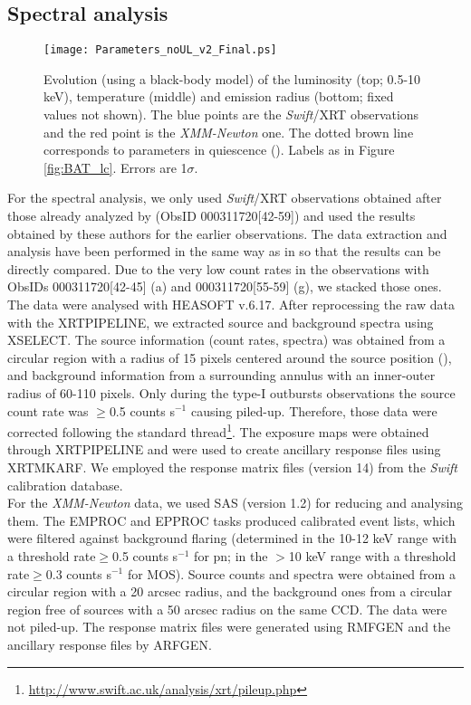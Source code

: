 \documentclass[a4paper,fleqn,usenatbib]{mnras}
\begin{document}
\subsection{Spectral analysis}\label{subsec:spectra}
\begin{figure}
\centering
\texttt{[image: Parameters\_noUL\_v2\_Final.ps]}
    \caption{Evolution (using a black-body model) of the luminosity (top; 0.5-10 keV), temperature (middle) and emission radius (bottom; fixed values not shown). The blue points are the \textit{Swift}/XRT observations and the red point is the \textit{XMM-Newton} one. The dotted brown line corresponds to parameters in quiescence (\citealt{Tsygankov2017b}). Labels as in Figure \ref{fig:BAT_lc}. Errors are 1$\sigma$.}
   \label{fig:Parameters}
\end{figure}
For the spectral analysis, we only used \textit{Swift}/XRT observations obtained after those already analyzed by \cite{Wijnands2016} (ObsID 000311720[42-59]) and used the results obtained by these authors for the earlier observations. The data extraction and analysis have been performed in the same way as in \cite{Wijnands2016} so that the results can be directly compared. Due to the very low count rates in the observations with ObsIDs 000311720[42-45] (a) and 000311720[55-59] (g), we stacked those ones. The data were analysed with HEASOFT v.6.17. After reprocessing the raw data with the XRTPIPELINE, we extracted source and background spectra using XSELECT. The source information (count rates, spectra) was obtained from a circular region with a radius of 15 pixels centered around the source position (\citealt{Reig2015}), and background information from a surrounding annulus with an inner-outer radius of 60-110 pixels. Only during the type-I outbursts observations the source count rate was $\geq$0.5 counts s$^{-1}$ causing piled-up. Therefore, those data were corrected following the standard thread\footnote{\url{http://www.swift.ac.uk/analysis/xrt/pileup.php}}. The exposure maps were obtained through XRTPIPELINE and were used to create ancillary response files using XRTMKARF. We employed the response matrix files (version 14) from the \textit{Swift} calibration database.\\
\indent For the \textit{XMM-Newton} data, we used SAS (version 1.2) for reducing and analysing them. The EMPROC and EPPROC tasks produced calibrated event lists, which were filtered against background flaring (determined in the 10-12 keV range with a threshold rate$\geq$0.5 counts s$^{-1}$ for pn; in the $>$10 keV range with a threshold rate$\geq$0.3 counts s$^{-1}$ for MOS). Source counts and spectra were obtained from a circular region with a 20 arcsec radius, and the background ones from a circular region free of sources with a 50 arcsec radius on the same CCD. The data were not piled-up. The response matrix files were generated using RMFGEN and the ancillary response files by ARFGEN.\\
\end{document}
